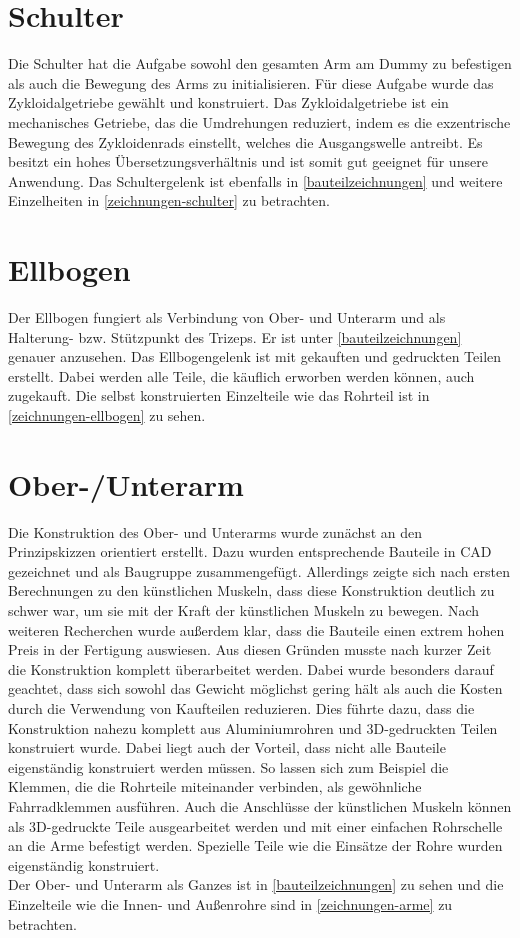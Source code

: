 	\section{Schulter}
		Die Schulter hat die Aufgabe sowohl den gesamten Arm am Dummy zu befestigen als auch die Bewegung des Arms zu initialisieren.
		Für diese Aufgabe wurde das Zykloidalgetriebe gewählt und konstruiert.
		Das Zykloidalgetriebe ist ein mechanisches Getriebe, das die Umdrehungen reduziert, indem es die exzentrische Bewegung des Zykloidenrads einstellt, welches die Ausgangswelle antreibt. Es besitzt ein hohes Übersetzungsverhältnis und ist somit gut geeignet für unsere Anwendung.
		Das Schultergelenk ist ebenfalls in \cref{bauteilzeichnungen} und weitere Einzelheiten in \cref{zeichnungen-schulter} zu betrachten.
	
	\section{Ellbogen}
		Der Ellbogen fungiert als Verbindung von Ober- und Unterarm und als Halterung- bzw. Stützpunkt des Trizeps.
		Er ist unter \cref{bauteilzeichnungen} genauer anzusehen.
		Das Ellbogengelenk ist mit gekauften und gedruckten Teilen erstellt.
		Dabei werden alle Teile, die käuflich erworben werden können, auch zugekauft.
		Die selbst konstruierten Einzelteile wie das Rohrteil ist in \cref{zeichnungen-ellbogen} zu sehen.
	
	\section{Ober-/Unterarm}
		Die Konstruktion des Ober- und Unterarms wurde zunächst an den Prinzipskizzen orientiert erstellt.
		Dazu wurden entsprechende Bauteile in CAD gezeichnet und als Baugruppe zusammengefügt.
		Allerdings zeigte sich nach ersten Berechnungen zu den künstlichen Muskeln, dass diese Konstruktion deutlich zu schwer war, um sie mit der Kraft der künstlichen Muskeln zu bewegen.
		Nach weiteren Recherchen wurde außerdem klar, dass die Bauteile einen extrem hohen Preis in der Fertigung auswiesen.
		Aus diesen Gründen musste nach kurzer Zeit die Konstruktion komplett überarbeitet werden.
		Dabei wurde besonders darauf geachtet, dass sich sowohl das Gewicht möglichst gering hält als auch die Kosten durch die Verwendung von Kaufteilen reduzieren.
		Dies führte dazu, dass die Konstruktion nahezu komplett aus Aluminiumrohren und 3D-gedruckten Teilen konstruiert wurde.
		Dabei liegt auch der Vorteil, dass nicht alle Bauteile eigenständig konstruiert werden müssen.
		So lassen sich zum Beispiel die Klemmen, die die Rohrteile miteinander verbinden, als gewöhnliche Fahrradklemmen ausführen.
		Auch die Anschlüsse der künstlichen Muskeln können als 3D-gedruckte Teile ausgearbeitet werden und mit einer einfachen Rohrschelle an die Arme befestigt werden.
		Spezielle Teile wie die Einsätze der Rohre wurden eigenständig konstruiert.\\
		Der Ober- und Unterarm als Ganzes ist in \cref{bauteilzeichnungen} zu sehen und die Einzelteile wie die Innen- und Außenrohre sind in \cref{zeichnungen-arme} zu betrachten.
	
